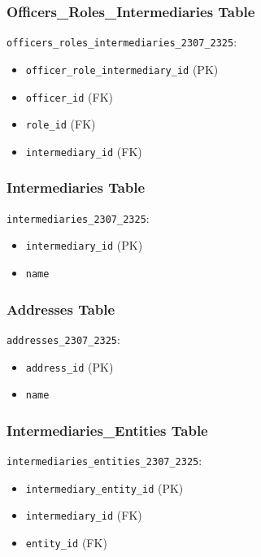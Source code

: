 \documentclass{article}
\begin{document}
\begin{minipage}{0.5\textwidth}

    \subsubsection*{Officers\_Roles\_Intermediaries Table}
    \texttt{officers\_roles\_intermediaries\_2307\_2325}:
    \begin{itemize}
        \item \texttt{officer\_role\_intermediary\_id} (PK)
        \item \texttt{officer\_id} (FK)
        \item \texttt{role\_id} (FK)
        \item \texttt{intermediary\_id} (FK)
    \end{itemize}

    \subsubsection*{Intermediaries Table}
    \texttt{intermediaries\_2307\_2325}:
    \begin{itemize}
        \item \texttt{intermediary\_id} (PK)
        \item \texttt{name}
    \end{itemize}

    \subsubsection*{Addresses Table}
    \texttt{addresses\_2307\_2325}:
    \begin{itemize}
        \item \texttt{address\_id} (PK)
        \item \texttt{name}
    \end{itemize}

    \subsubsection*{Intermediaries\_Entities Table}
    \texttt{intermediaries\_entities\_2307\_2325}:
    \begin{itemize}
        \item \texttt{intermediary\_entity\_id} (PK)
        \item \texttt{intermediary\_id} (FK)
        \item \texttt{entity\_id} (FK)
    \end{itemize}


\end{minipage}
\end{document}
